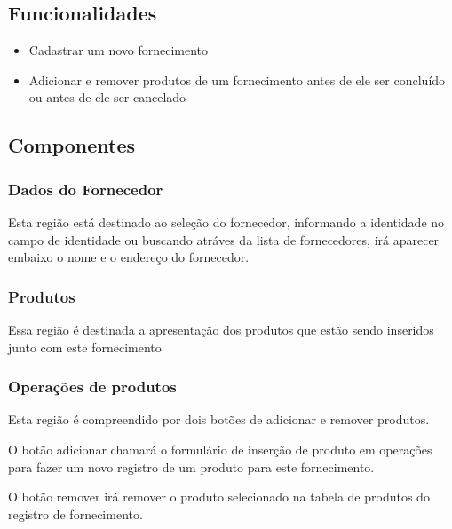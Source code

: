 \documentclass[
	article,			%
	12pt,				%
	oneside,			%
	a4paper,			%
	english,			%
	brazil,				%
	sumario=tradicional
	]{abntex2}
\begin{document}
		\subsection{Funcionalidades}
			\begin{itemize}
			\item Cadastrar um novo fornecimento
			\item Adicionar e remover produtos de um fornecimento antes de ele ser concluído ou antes de ele ser cancelado 
			\end{itemize}
		\subsection{Componentes}
			\subsubsection{Dados do Fornecedor}
			Esta região está destinado ao seleção do fornecedor, informando a identidade no campo de identidade ou buscando atráves da lista de fornecedores, irá aparecer embaixo o nome e o endereço do fornecedor.
			\subsubsection{Produtos}
			Essa região é destinada a apresentação dos produtos que estão sendo inseridos junto com este fornecimento
			\subsubsection{Operações de produtos}
			Esta região é compreendido por dois botões de adicionar e remover produtos.
			
			O botão adicionar chamará o formulário de inserção de produto em operações para fazer um novo registro de um produto para este fornecimento.
			
			O botão remover irá remover o produto selecionado na tabela de produtos do registro de fornecimento.
	
	\newpage
\end{document}
